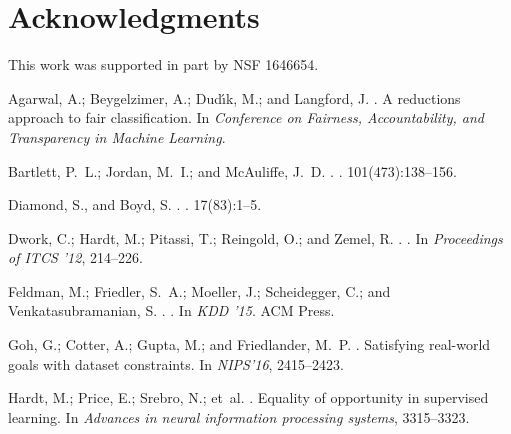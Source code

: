 \documentclass[letterpaper]{article} %
\begin{document}

\section*{Acknowledgments}
This work was supported in part by NSF 1646654.


%
\begin{thebibliography}{}

Agarwal, A.; Beygelzimer, A.; Dud{\'\i}k, M.; and Langford, J.
.
\newblock A reductions approach to fair classification.
\newblock In {\em Conference on Fairness, Accountability, and Transparency in
  Machine Learning}.

Bartlett, P.~L.; Jordan, M.~I.; and McAuliffe, J.~D.
.
.
  101(473):138--156.

Diamond, S., and Boyd, S.
.
.
 17(83):1--5.

Dwork, C.; Hardt, M.; Pitassi, T.; Reingold, O.; and Zemel, R.
.
.
\newblock In {\em Proceedings of ITCS '12},  214--226.

Feldman, M.; Friedler, S.~A.; Moeller, J.; Scheidegger, C.; and
  Venkatasubramanian, S.
.
.
\newblock In {\em KDD '15}.
\newblock ACM Press.

Goh, G.; Cotter, A.; Gupta, M.; and Friedlander, M.~P.
.
\newblock Satisfying real-world goals with dataset constraints.
\newblock In {\em NIPS'16},  2415--2423.

Hardt, M.; Price, E.; Srebro, N.; et~al.
.
\newblock Equality of opportunity in supervised learning.
\newblock In {\em Advances in neural information processing systems},
  3315--3323.


\end{thebibliography}
\end{document}
